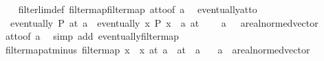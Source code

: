 \begin{isabellebody}
%
\isadelimproof
\ \ %
\endisadelimproof
%
\isatagproof
{}\isamarkupfalse%
\ filterlim{\isacharunderscore}{\kern0pt}def\ filtermap{\isacharunderscore}{\kern0pt}filtermap\ at{\isacharunderscore}{\kern0pt}to{\isacharunderscore}{\kern0pt}{}{\isacharbrackleft}{\kern0pt}of\ a{\isacharbrackright}{\kern0pt}\ \isacommand{{\isachardot}{\kern0pt}{\isachardot}{\kern0pt}}\isamarkupfalse%
%
\endisatagproof
{\isafoldproof}%
%
\isadelimproof
\isanewline
%
\endisadelimproof
\isanewline
{}\isamarkupfalse%
\ eventually{\isacharunderscore}{\kern0pt}at{\isacharunderscore}{\kern0pt}to{\isacharunderscore}{\kern0pt}{}{\isacharcolon}{\kern0pt}\isanewline
\ \ {\isachardoublequoteopen}eventually\ P\ {\isacharparenleft}{\kern0pt}at\ a{\isacharparenright}{\kern0pt}\ {\isasymlongleftrightarrow}\ eventually\ {\isacharparenleft}{\kern0pt}{\isasymlambda}x{\isachardot}{\kern0pt}\ P\ {\isacharparenleft}{\kern0pt}x\ {\isacharplus}{\kern0pt}\ a{\isacharparenright}{\kern0pt}{\isacharparenright}{\kern0pt}\ {\isacharparenleft}{\kern0pt}at\ {}{\isacharparenright}{\kern0pt}{\isachardoublequoteclose}\isanewline
\ \ \ a\ {\isacharcolon}{\kern0pt}{\isacharcolon}{\kern0pt}\ \ {\isachardoublequoteopen}{\isacharprime}{\kern0pt}a{\isacharcolon}{\kern0pt}{\isacharcolon}{\kern0pt}real{\isacharunderscore}{\kern0pt}normed{\isacharunderscore}{\kern0pt}vector{\isachardoublequoteclose}\isanewline
%
\isadelimproof
\ \ %
\endisadelimproof
%
\isatagproof
{}\isamarkupfalse%
\ at{\isacharunderscore}{\kern0pt}to{\isacharunderscore}{\kern0pt}{}{\isacharbrackleft}{\kern0pt}of\ a{\isacharbrackright}{\kern0pt}\ \isamarkupfalse%
\ {\isacharparenleft}{\kern0pt}simp\ add{\isacharcolon}{\kern0pt}\ eventually{\isacharunderscore}{\kern0pt}filtermap{\isacharparenright}{\kern0pt}%
\endisatagproof
{\isafoldproof}%
%
\isadelimproof
\isanewline
%
\endisadelimproof
\isanewline
{}\isamarkupfalse%
\ filtermap{\isacharunderscore}{\kern0pt}at{\isacharunderscore}{\kern0pt}minus{\isacharcolon}{\kern0pt}\ {\isachardoublequoteopen}filtermap\ {\isacharparenleft}{\kern0pt}{\isasymlambda}x{\isachardot}{\kern0pt}\ {\isacharminus}{\kern0pt}\ x{\isacharparenright}{\kern0pt}\ {\isacharparenleft}{\kern0pt}at\ a{\isacharparenright}{\kern0pt}\ {\isacharequal}{\kern0pt}\ at\ {\isacharparenleft}{\kern0pt}{\isacharminus}{\kern0pt}\ a{\isacharparenright}{\kern0pt}{\isachardoublequoteclose}\isanewline
\ \ \ a\ {\isacharcolon}{\kern0pt}{\isacharcolon}{\kern0pt}\ {\isachardoublequoteopen}{\isacharprime}{\kern0pt}a{\isacharcolon}{\kern0pt}{\isacharcolon}{\kern0pt}real{\isacharunderscore}{\kern0pt}normed{\isacharunderscore}{\kern0pt}vector{\isachardoublequoteclose}\isanewline

\end{isabellebody}
